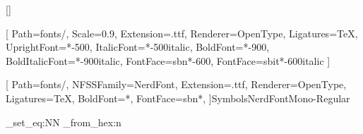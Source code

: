 
\usepackage[letterpaper, margin=0.5in, top=0.4in]{geometry}
\usepackage{hyperref}
\usepackage{multicol}




\usepackage{titlesec}

\titleformat{\subsection}{\normalfont\normalsize\bfseries}{}{}{}[]
\titlespacing{\subsection}{0pt}{1ex}{0pt}

\setcounter{secnumdepth}{0}


\usepackage{xcolor}


\color{bgcolor}


\usepackage{fontspec}


\setmainfont{asap}[
    Path=fonts/,
    Scale=0.9,
    Extension=.ttf, 
    Renderer=OpenType,
    Ligatures=TeX,
    UprightFont=*-500,
    ItalicFont=*-500italic,
    BoldFont=*-900,
    BoldItalicFont=*-900italic, 
    FontFace={sb}{n}{*-600},
    FontFace={sb}{it}{*-600italic}
]

\newfontfamily{\NerdFont}[
    Path=fonts/,
    NFSSFamily=NerdFont,
    Extension=.ttf,
    Renderer=OpenType,
    Ligatures=TeX,
    BoldFont=*,
    FontFace={sb}{n}{*},
]{SymbolsNerdFontMono-Regular}


\usepackage{expl3}

\ExplSyntaxOn
\cs_set_eq:NN \intfromhex \int_from_hex:n
\ExplSyntaxOff

